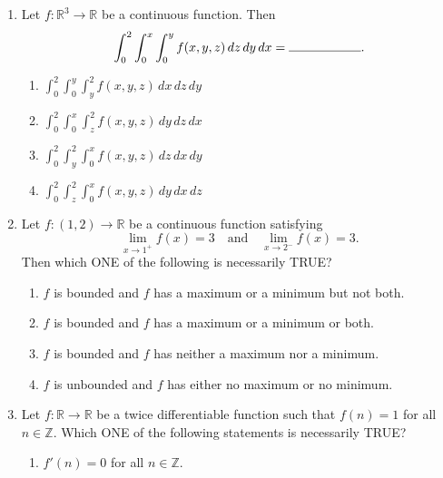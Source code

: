 \begin{enumerate}
\[x\sin\left(\frac yx\right)\frac{dy}{dx}=y\sin\left(\frac yx\right)+\frac x2,\qquad x>0\]
is given by \rule{2cm}{0.4pt}.
\begin{enumerate}[label=(\Alph*)]
\item $\cos(\frac xy)+\log_e(x^2)=K$, where $K$ is an arbitrary constant
\item $\cos(\frac yx)+\log_e(x^2)=K$, where $K$ is an arbitrary constant
\item $\cos(\frac xy)+\log_e(\sqrt x)=K$, where $K$ is an arbitrary constant
\item $\cos(\frac yx)+\log_e(\sqrt x)=K$, where $K$ is an arbitrary constant
\end{enumerate}
\item Let $f:\mathbb R^3\to\mathbb R$ be a continuous function. Then
\[\int_0^2\int_0^x\int_0^y f(x,y,z)\,dz\,dy\,dx=\rule{2cm}{0.4pt}.\]
\begin{enumerate}[label=(\Alph*)]
\item $\displaystyle\int_0^2\int_0^y\int_y^2 f(x,y,z)\,dx\,dz\,dy$
\item $\displaystyle\int_0^2\int_0^x\int_z^2 f(x,y,z)\,dy\,dz\,dx$
\item $\displaystyle\int_0^2\int_y^2\int_0^x f(x,y,z)\,dz\,dx\,dy$
\item $\displaystyle\int_0^2\int_z^2\int_0^x f(x,y,z)\,dy\,dx\,dz$
\end{enumerate}
\item Let $f:(1,2)\to\mathbb R$ be a continuous function satisfying
\[\lim_{x\to1^+}f(x)=3\quad\text{and}\quad\lim_{x\to2^-}f(x)=3.\]
Then which ONE of the following is necessarily TRUE?
\begin{enumerate}[label=(\Alph*)]
\item $f$ is bounded and $f$ has a maximum or a minimum but not both.
\item $f$ is bounded and $f$ has a maximum or a minimum or both.
\item $f$ is bounded and $f$ has neither a maximum nor a minimum.
\item $f$ is unbounded and $f$ has either no maximum or no minimum.
\end{enumerate}
\item Let $f:\mathbb R\to\mathbb R$ be a twice differentiable function such that $f(n)=1$ for all $n\in\mathbb Z$. Which ONE of the following statements is necessarily TRUE?
\begin{enumerate}[label=(\Alph*)]
\item $f'(n)=0$ for all $n\in\mathbb Z$.

\end{enumerate}
\end{enumerate}
